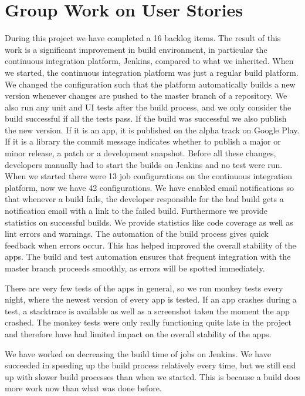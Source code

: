 \section{Group Work on User Stories}\label{conc:userstories}
During this project we have completed a 16 backlog items. The result of this work is a significant improvement in build environment, in particular the continuous integration platform, Jenkins, compared to what we inherited. When we started, the continuous integration platform was just a regular build platform. We changed the configuration such that the platform automatically builds a new version whenever changes are pushed to the master branch of a repository. We also run any unit and UI tests after the build process, and we only consider the build successful if all the tests pass. If the build was successful we also publish the new version. If it is an app, it is published on the alpha track on Google Play. If it is a library the commit message indicates whether to publish a major or minor release, a patch or a development snapshot. Before all these changes, developers manually had to start the builds on Jenkins and no test were run. When we started there were 13 job configurations on the continuous integration platform, now we have 42 configurations. We have enabled email notifications so that whenever a build fails, the developer responsible for the bad build gets a notification email with a link to the failed build. Furthermore we provide statistics on successful builds. We provide statistics like code coverage as well as lint errors and warnings. The automation of the build process gives quick feedback when errors occur. This has helped improved the overall stability of the apps. The build and test automation ensures that frequent integration with the master branch proceeds smoothly, as errors will be spotted immediately.

There are very few tests of the apps in general, so we run monkey tests every night, where the newest version of every app is tested. If an app crashes during a test, a stacktrace is available as well as a screenshot taken the moment the app crashed. The monkey tests were only really functioning quite late in the project and therefore have had limited impact on the overall stability of the apps.

We have worked on decreasing the build time of jobs on Jenkins. We have succeeded in speeding up the build process relatively every time, but we still end up with slower build processes than when we started. This is because a build does more work now than what was done before.

